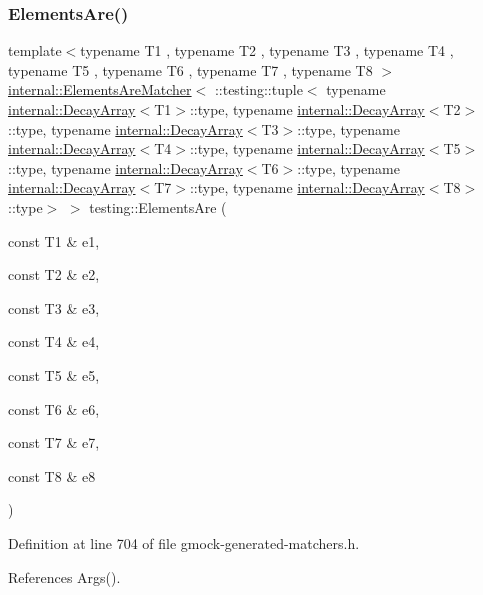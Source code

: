 \subsubsection{\texorpdfstring{Elements\+Are()}{ElementsAre()}\hspace{0.1cm}{\footnotesize\ttfamily [9/11]}}
{\footnotesize\ttfamily template$<$typename T1 , typename T2 , typename T3 , typename T4 , typename T5 , typename T6 , typename T7 , typename T8 $>$ \\
\hyperlink{classtesting_1_1internal_1_1ElementsAreMatcher}{internal\+::\+Elements\+Are\+Matcher}$<$ \+::testing\+::tuple$<$ typename \hyperlink{structtesting_1_1internal_1_1DecayArray}{internal\+::\+Decay\+Array}$<$T1$>$\+::type, typename \hyperlink{structtesting_1_1internal_1_1DecayArray}{internal\+::\+Decay\+Array}$<$T2$>$\+::type, typename \hyperlink{structtesting_1_1internal_1_1DecayArray}{internal\+::\+Decay\+Array}$<$T3$>$\+::type, typename \hyperlink{structtesting_1_1internal_1_1DecayArray}{internal\+::\+Decay\+Array}$<$T4$>$\+::type, typename \hyperlink{structtesting_1_1internal_1_1DecayArray}{internal\+::\+Decay\+Array}$<$T5$>$\+::type, typename \hyperlink{structtesting_1_1internal_1_1DecayArray}{internal\+::\+Decay\+Array}$<$T6$>$\+::type, typename \hyperlink{structtesting_1_1internal_1_1DecayArray}{internal\+::\+Decay\+Array}$<$T7$>$\+::type, typename \hyperlink{structtesting_1_1internal_1_1DecayArray}{internal\+::\+Decay\+Array}$<$T8$>$\+::type$>$ $>$ testing\+::\+Elements\+Are (\begin{DoxyParamCaption}\item[{const T1 \&}]{e1,  }\item[{const T2 \&}]{e2,  }\item[{const T3 \&}]{e3,  }\item[{const T4 \&}]{e4,  }\item[{const T5 \&}]{e5,  }\item[{const T6 \&}]{e6,  }\item[{const T7 \&}]{e7,  }\item[{const T8 \&}]{e8 }\end{DoxyParamCaption})\hspace{0.3cm}{\ttfamily [inline]}}



Definition at line 704 of file gmock-\/generated-\/matchers.\+h.



References Args().


